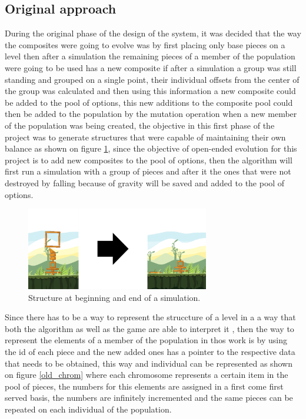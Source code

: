 \documentclass[conference]{IEEEtran}
\begin{document}
\subsection{Original approach}
During the original phase of the design of the system, it was decided that the way 
the composites were going to evolve was by first placing only base pieces on a level 
then after a simulation the remaining pieces
of a member of the population were going to be used has a new composite if after a 
simulation a group was still standing and grouped on a single point, their individual 
offsets from the center of the group was calculated and then using this information a new 
composite could be added to the pool of options, this new
additions to the composite pool could then be added to the population by the mutation
operation when a new member of the population was being created, the objective 
in this first phase of the project was to generate
structures that were capable of maintaining their own balance as shown on figure
\ref{test_old}, since the objective of open-ended evolution for this project is
to add new composites to the pool of options, then the algorithm will first run a
simulation with a group of pieces and after it the ones that were not destroyed
by falling because of gravity will be saved and added to the pool of options.



\begin{figure}[htbp]
\centerline{\includegraphics[width=80mm]{Images/simulation_bef_aft_example.png}}
\caption{Structure at beginning and end of a simulation.}
\label{test_old}
\end{figure}

Since there has to be a way to represent the struccture of a level in a a way that
both the algorithm as well as the game are able to interpret it \cite{togelius2016Representationsforsearch-basedmethods}, 
then the way to represent the elements of a member of the population in thos work 
is by using the id of each piece and the new added ones has a pointer to the respective data
that needs to be obtained, this way and individual can be represented as shown
on figure \ref{old_chrom} where each chromosome represents a certain item in the
pool of pieces, the numbers for this elements are assigned in a first come first
served basis, the numbers are infinitely incremented and the same pieces can be
repeated on each individual of the population.
\end{document}
